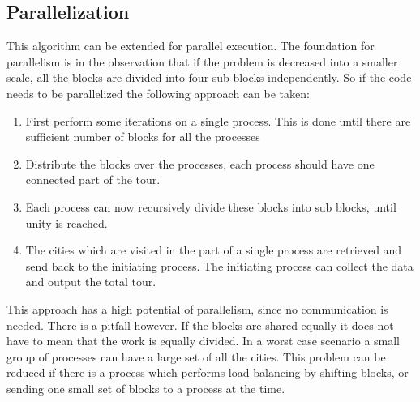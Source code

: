 \subsection{Parallelization}
This algorithm can be extended for parallel execution. The foundation for
parallelism is in the observation that if the problem is decreased into a smaller scale, 
all the blocks are divided into four sub blocks independently. So if the code needs
to be parallelized the following approach can be taken:

\begin{enumerate}
\item First perform some iterations on a single process. This is done until
there are sufficient number of blocks for all the processes
\item Distribute the blocks over the processes, each process should have one
connected part of the tour.
\item Each process can now recursively divide these blocks into sub blocks,
until unity is reached.
\item The cities which are visited in the part of a single process are
retrieved and send back to the initiating process. The initiating process can collect the
data and output the total tour.
\end{enumerate}

This approach has a high potential of parallelism, since no communication is
needed. There is a pitfall however. If the blocks are shared equally it does
not have to mean that the work is equally divided. In a worst case scenario a
small group of processes can have a large set of all the cities. This problem
can be reduced if there is a process which performs load balancing by shifting
blocks, or sending one small set of blocks to a process at the time.

